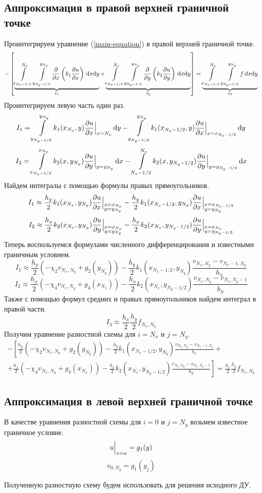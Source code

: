\subsection{Аппроксимация в правой верхней граничной точке}
Проинтегрируем уравнение (\ref{main-equation}) в правой верхней граничной точке.
\[
  - \left[
  \underbrace{ \int\limits_{x_{N_x - 1/2}}^{N_x}\int\limits_{y_{N_y-1/2}}^{y_{N_y}} \! \pdv{x}\left( k_1 \pdv{u}{x} \right) \, \dd x \dd y }_{I_1} +
  \underbrace{ \int\limits_{x_{N_x - 1/2}}^{N_x}\int\limits_{y_{N_y-1/2}}^{y_{N_y}} \! \pdv{y}\left( k_2 \pdv{u}{y} \right) \, \dd x \dd y }_{I_2}
  \right] =
  \underbrace{ \int\limits_{x_{N_x - 1/2}}^{N_x}\int\limits_{y_{N_y-1/2}}^{y_{N_y}} \! f \, \dd x \dd y }_{I_3}
\]
Проинтегрируем левую часть один раз.
\[ I_1 = \int\limits_{y_{N_y-1/2}}^{y_{N_y}} \! k_1(x_{N_x},y) \pdv{u}{x} \Big\vert_{x = N_x} \, \dd y - \int\limits_{y_{N_y-1/2}}^{y_{N_y}} \! k_1(x_{N_x-1/2},y) \pdv{u}{x} \Big\vert_{x = x_{N_x-1/2}} \, \dd y \]
\[ I_2 = \int\limits_{x_{N_x-1/2}}^{x_{N_x}} \! k_2(x,y_{N_y}) \pdv{u}{y} \Big\vert_{y = y_{N_y}} \, \dd x - \int\limits_{N_x - 1/2}^{N_x} \! k_2(x,y_{N_y-1/2}) \pdv{u}{y} \Big\vert_{y = y_{N_y-1/2}} \, \dd x \]
Найдем интегралы с помощью формулы правых прямоугольников.
\[ I_1 \approx \frac{h_y}{2} k_1(x_{N_x},y_{N_y}) \pdv{u}{x} \Big\vert_{\begin{subarray}{l} x = x_{N_x} \\ y = y_{N_y} \end{subarray}} - \frac{h_y}{2} k_1(x_{N_x-1/2},y_{N_y}) \pdv{u}{x} \Big\vert_{\begin{subarray}{l} x = x_{N_x-1/2} \\ y = y_{N_y} \end{subarray}} \]
\[ I_2 \approx \frac{h_x}{2} k_2(x_{N_x},y_{N_y}) \pdv{u}{y} \Big\vert_{\begin{subarray}{l} x = x_{N_x} \\ y = y_{N_y} \end{subarray}} - \frac{h_x}{2} k_2(x_{N_x},y_{N_y-1/2}) \pdv{u}{y} \Big\vert_{\begin{subarray}{l} x = x_{N_x} \\ y = y_{N_y-1/2} \end{subarray}} \]
Теперь воспользуемся формулами численного дифференцирования и известными граничным условием.
\[ I_1 \approx \frac{h_y}{2} (- \chi_2 v_{{N_x},N_y} + g_2(y_{N_y}) ) - \frac{h_y}{2} k_1(x_{N_x-1/2},y_{N_y}) \frac{v_{{N_x},N_y} - v_{{N_x}-1,N_y}}{h_x} \]
\[ I_2 \approx \frac{h_x}{2} \left( - \chi_4 v_{N_x,N_y} + g_4(x_{N_x}) \right) - \frac{h_x}{2} k_2(x_{N_x},y_{N_y-1/2}) \frac{v_{N_x,N_y} - v_{N_x,N_y-1}}{h_y} \]
Также с помощью формул средних и правых прямоугольников найдем интеграл в правой части.
\[ I_3 \approx \frac{h_x}{2} \frac{h_y}{2} f_{N_x, N_y} \]
Получим уравнение разностной схемы для $i = N_x$ и $j = N_y$.
\begin{multline*}
  - \left[
    \frac{h_y}{2} (- \chi_2 v_{{N_x},N_y} + g_2(y_{N_y}) ) - \frac{h_y}{2} k_1(x_{N_x-1/2},y_{N_y}) \frac{v_{{N_x},N_y} - v_{{N_x}-1,N_y}}{h_x} + \right. \\
  \left. +
  \frac{h_x}{2} \left( - \chi_4 v_{N_x,N_y} + g_4(x_{N_x}) \right) - \frac{h_x}{2} k_2(x_{N_x},y_{N_y-1/2}) \frac{v_{N_x,N_y} - v_{N_x,N_y-1}}{h_y}
  \right] =
  \frac{h_x}{2} \frac{h_y}{2} f_{N_x, N_y}
\end{multline*}

\subsection{Аппроксимация в левой верхней граничной точке}
В качестве уравнения разностной схемы для $i = 0$ и $j = N_y$ возьмем
известное граничное условие.
\[ u \Big\vert_{x = a} = g_1(y) \]
\[ v_{0,N_y} = g_1(y_j) \]

Полученную разностную схему будем использовать для решения исходного ДУ.
